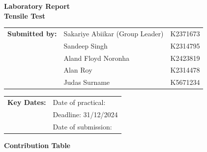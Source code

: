 \documentclass{article}
\begin{document}
        

    \vspace*{\fill}
    \begin{center}
        \textbf{\Huge Laboratory Report}\\[10pt]
        \LARGE \textbf{Tensile Test}
    \end{center}
    \vspace*{\fill}

    \Large    
    \begin{tabular}{@{}l l l@{}}
        \textbf{Submitted by:} & Sakariye Abiikar (Group Leader) & K2371673 \\
        & Sandeep Singh & K2314795 \\
        & Aland Floyd Noronha & K2423819 \\
        & Alan Roy & K2314478 \\
        & Judas Surname & K5671234 \\
    \end{tabular}
    
    \vspace*{\fill}
    
    \begin{tabular}{@{}l l@{}}
        \textbf{Key Dates:} & Date of practical: \\
        & Deadline: 31/12/2024 \\
        & Date of submission: \\
    \end{tabular}
    \vspace*{\fill}
    
    \large
    \newpage\noindent\vspace{2em}
    \begin{center}
        \LARGE \textbf{Contribution Table}\\[3em]
    \end{center}
    
\end{document}
